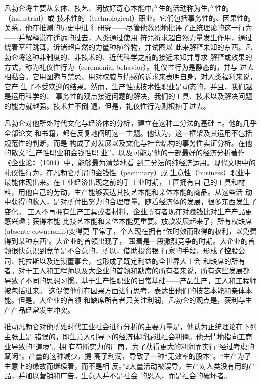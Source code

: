 凡勃仑将主要从亲体、技艺、闲散好奇心本能中产生的活动称为生产性的（industrial）或
技术性的（technological）职业。它们包括事务性的、因果性的关系。他在推测的历史中进
行研究——尽管他激烈地批评了正统理论的这一行为——并解释说在遥远的过去，人类通过使用
符咒祈求超自然力量发生作用，通过绕着茎秆跳舞，诉诸超自然的力量种植谷物，并试图以
此来解释未知的东西。凡勃仑将这种非制度的、非技术的、近代科学之前的接近未知并寻求
解释或效果的方式，称为礼仪性行为（ceremonial behavior）。礼仪性行为是静态的，并与
过去相黏合。它用图腾与禁忌、用对权威与情感的诉求来表明自身，对人类福利来说，它产
生了不受欢迎的结果。然而，生产性或技术性职业是动态的，并且，我们越是运用科学的、
事务性的观点接近问题的解决，我们的工具、技术以及解决问题的能力就越强。技术并不倒
退，但是，礼仪性行为则根植于过去。

凡勃仑对他所处时代文化与经济体的分析，建立在这种二分法的基础上。他的几乎全部论文
和书籍，都在反复地阐明这一主题。他认为，这一框架及其运用不包括规范性的判断，而是
构成了对发展以及文化与社会结构的事务性实证分析。在他的散文“生产性职业和金钱性职
业”，以及可能是他的一部最好的经济分析著作《企业论》（1904）中，能够最为清楚地看
到二分法的纯经济运用。现代文明中的礼仪性行为，在凡勃仑所谓的金钱性（pecuniary）或
生意性（business）职业中最能体现出来。在工业经济出现之前的手工业时期，工匠拥有自
己的工具和材料，用他自己的劳动，生产能够表达其技艺本能和亲体本能的商品。从这些活
动中获得的收入，是对所付出努力的合理度量。随着经济体的发展，很多东西发生了变化。
工人不再拥有生产工具或者材料，企业所有者现在对赚钱比对生产产品更感兴趣；获得本能
比技艺本能和亲体本能更重要。放款发展起来了，所有权缺席(absente eownership)变得更
平常了，个人现在拥有“依时效而取得的权利，以免费得到某种东西"。大企业的首领出现了，
跟着是一段激烈竞争的时期。大企业的首领很快意识到竞争是不合意的，所以，借助投资银
行家的手段，形成了控股公司、托拉斯以及连锁董事会，也形成了既定利益的全世界大工会
和缺席的所有者。对于工人和工程师以及大企业的首领和缺席的所有者来说，所有这些发展都
导致了不同的思想习惯。基于生产性职业的日常基础——产品生产，工人和工程师被包括进来。
这促使他们在因果方面进行思考，表达出他们的技艺本能和亲体本能。但是，大企业的首领
和缺席所有者只关注利润，凡勃仑的观点是，获利与生产产品经常发生冲突。

推动凡勃仑对他所处时代工业社会进行分析的主要力量是，他认为正统理论在下列主张上是
错误的，即生意人引导下的经济体将促进社会利僵。他无情地指向工商业导致的“道境"。拥
有芍断实力的厂商，为了获得更大的利润而实行“经过考虑的赋闲”。产量的这种减少，提
高了利润，导致了一种“无效率的股本”。“生产为了生意上的缘故而继续着，而不是相
反。”2大量活动被误导，生产对人类没有用的产品，并加以营销和广告。生意人并不是社会
的恩人，而是社会的破坏者。

